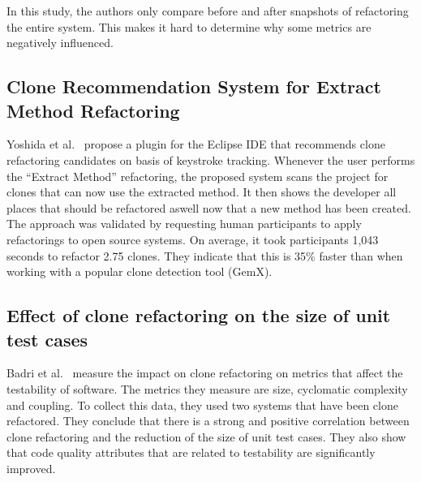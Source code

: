 In this study, the authors only compare before and after snapshots of refactoring the entire system. This makes it hard to determine why some metrics are negatively influenced.

\subsection{Clone Recommendation System for Extract Method Refactoring}
Yoshida et al.~\cite{yoshida2019proactive} propose a plugin for the Eclipse IDE that recommends clone refactoring candidates on basis of keystroke tracking. Whenever the user performs the ``Extract Method'' refactoring, the proposed system scans the project for clones that can now use the extracted method. It then shows the developer all places that should be refactored aswell now that a new method has been created. The approach was validated by requesting human participants to apply refactorings to open source systems. On average, it took participants 1,043 seconds to refactor 2.75 clones. They indicate that this is 35\% faster than when working with a popular clone detection tool (GemX).

\subsection{Effect of clone refactoring on the size of unit test cases}
Badri et al.~\cite{badri2019measuring} measure the impact on clone refactoring on metrics that affect the testability of software. The metrics they measure are size, cyclomatic complexity and coupling. To collect this data, they used two systems that have been clone refactored. %
They conclude that there is a strong and positive %
correlation between clone refactoring and the reduction of the size of unit test cases. They also show that code quality attributes that are related to testability are significantly improved.
